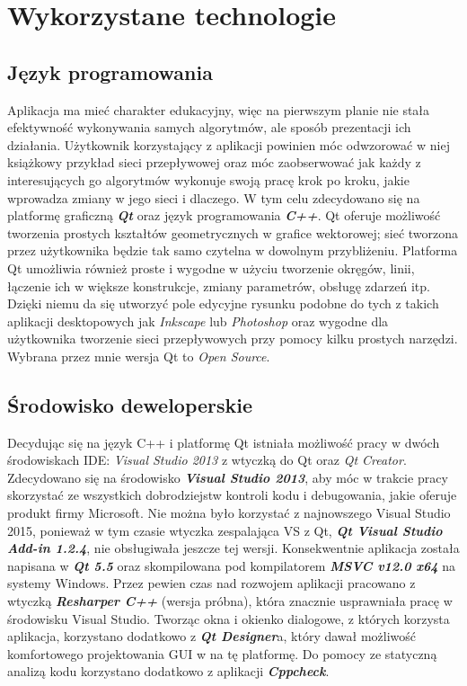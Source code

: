 \section{Wykorzystane technologie}
\subsection{Język programowania}\label{ssec:technologieJezyk}
Aplikacja ma mieć charakter edukacyjny, więc na pierwszym planie nie stała efektywność wykonywania samych algorytmów, ale sposób prezentacji ich działania. Użytkownik korzystający z aplikacji powinien móc odwzorować w niej książkowy przykład sieci przepływowej oraz móc zaobserwować jak każdy z interesujących go algorytmów wykonuje swoją pracę krok po kroku, jakie wprowadza zmiany w jego sieci i dlaczego. W tym celu zdecydowano się na platformę graficzną \textbf{\textit{Qt}} oraz język programowania \textbf{\textit{C++}}. Qt oferuje możliwość tworzenia prostych kształtów geometrycznych w grafice wektorowej; sieć tworzona przez użytkownika będzie tak samo czytelna w dowolnym przybliżeniu. Platforma Qt umożliwia również proste i wygodne w użyciu tworzenie okręgów, linii, łączenie ich w większe konstrukcje, zmiany parametrów, obsługę zdarzeń itp. Dzięki niemu da się utworzyć pole edycyjne rysunku podobne do tych z takich aplikacji desktopowych jak \textit{Inkscape} lub \textit{Photoshop} oraz wygodne dla użytkownika tworzenie sieci przepływowych przy pomocy kilku prostych narzędzi. Wybrana przez mnie wersja Qt to \emph{Open Source}.
\subsection{Środowisko deweloperskie}
Decydując się na język C++ i platformę Qt istniała możliwość pracy w dwóch środowiskach IDE: \textit{Visual Studio 2013} z wtyczką do Qt oraz \textit{Qt Creator}. Zdecydowano się na środowisko \textit{\textbf{Visual Studio 2013}}, aby móc w trakcie pracy skorzystać ze wszystkich dobrodziejstw kontroli kodu i debugowania, jakie oferuje produkt firmy Microsoft. Nie można było korzystać z najnowszego Visual Studio 2015, ponieważ w tym czasie wtyczka zespalająca VS z Qt, \textbf{\textit{Qt Visual Studio Add-in 1.2.4}}, nie obsługiwała jeszcze tej wersji. Konsekwentnie aplikacja została napisana w \textit{\textbf{Qt 5.5}} oraz skompilowana pod kompilatorem \textbf{\textit{MSVC v12.0 x64}} na systemy Windows. Przez pewien czas nad rozwojem aplikacji pracowano z wtyczką \textbf{\textit{Resharper C++}} (wersja próbna), która znacznie usprawniała pracę w środowisku Visual Studio. Tworząc okna i okienko dialogowe, z których korzysta aplikacja, korzystano dodatkowo z \textbf{\textit{Qt Designer}}a, który dawał możliwość komfortowego projektowania GUI w na tę platformę. Do pomocy ze statyczną analizą kodu korzystano dodatkowo z aplikacji \textbf{\textit{Cppcheck}}.
